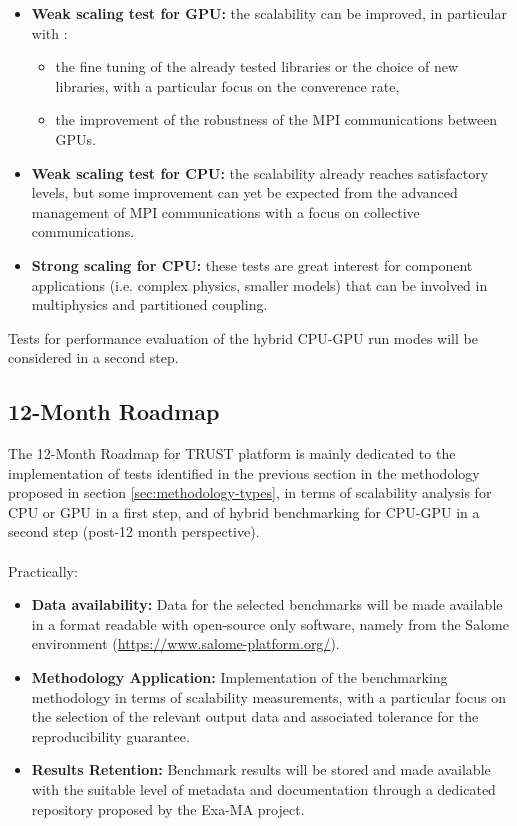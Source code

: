 \begin{itemize}
    \item \textbf{Weak scaling test for GPU: } the scalability can be improved, in particular with :
    \begin{itemize}
        \item the fine tuning of the already tested libraries or the choice of new libraries, with a particular focus on the converence rate,
        \item the improvement of the robustness of the MPI communications between GPUs.
    \end{itemize}
    \item\textbf{Weak scaling test for CPU: } the scalability already reaches satisfactory levels, but some improvement can yet be expected from the advanced management of MPI communications with a focus on collective communications.
    \item \textbf{Strong scaling for CPU: } these tests are great interest for component applications (i.e. complex physics, smaller models) that can be involved in multiphysics and partitioned coupling.
\end{itemize}

Tests for performance evaluation of the hybrid CPU-GPU run modes will be considered in a second step.

\subsection{12-Month Roadmap}
\label{sec:WP3:TRUST Platform:roadmap}

The 12-Month Roadmap for TRUST platform is mainly dedicated to the implementation of tests identified in the previous section in the methodology proposed in section \ref{sec:methodology-types}, in terms of scalability analysis for CPU or GPU in a first step, and of hybrid benchmarking for CPU-GPU in a second step (post-12 month perspective).\\
\\
Practically:
\begin{itemize}
    \item \textbf{Data availability:} Data for the selected benchmarks will be made available in a format readable with open-source only software, namely from the Salome environment (\href{https://www.salome-platform.org/}{https://www.salome-platform.org/}).
    \item \textbf{Methodology Application:} Implementation of the benchmarking methodology in terms of scalability measurements, with a particular focus on the selection of the relevant output data and associated tolerance for the reproducibility guarantee.
    \item \textbf{Results Retention:} Benchmark results will be stored and made available with the suitable level of metadata and documentation through a dedicated repository proposed by the Exa-MA project.
\end{itemize}

